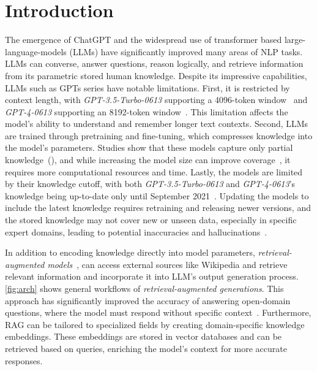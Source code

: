 \section{Introduction}

The emergence of ChatGPT and the widespread use of transformer based large-language-models (LLMs) have significantly improved many areas of NLP tasks. LLMs can converse, answer questions, reason logically, and retrieve information from its parametric stored human knowledge. Despite its impressive capabilities, LLMs such as GPTs series have notable limitations. First, it is restricted by context length, with \emph{GPT-3.5-Turbo-0613} supporting a 4096-token window~\cite{gpt3.5turbo} and \emph{GPT-4-0613} supporting an 8192-token window~\cite{gpt4turbo}. This limitation affects the model's ability to understand and remember longer text contexts. Second, LLMs are trained through pretraining and fine-tuning, which compresses knowledge into the model's parameters. Studies show that these models capture only partial knowledge~(\citet{LAMA}), and while increasing the model size can improve coverage~\citep{T5,DBLP:conf/emnlp/RobertsRS20,GPT3}, it requires more computational resources and time. Lastly, the models are limited by their knowledge cutoff, with both \emph{GPT-3.5-Turbo-0613} and \emph{GPT-4-0613}'s knowledge being up-to-date only until September 2021~\cite{gpt3.5turbo, gpt4turbo}. Updating the models to include the latest knowledge requires retraining and releasing newer versions, and the stored knowledge may not cover new or unseen data, especially in specific expert domains, leading to potential inaccuracies and hallucinations~\cite{maynez-etal-2020-faithfulness}.

In addition to encoding knowledge directly into model parameters, \emph{retrieval-augmented models}~\citep{REALM, RAG, FiD, spanlp-2022-semiparametric}, can access external sources like Wikipedia and retrieve relevant information and incorporate it into LLM’s output generation process. \cref{fig:arch} shows general workflows of \emph{retrieval-augmented generations}. This approach has significantly improved the accuracy of answering open-domain questions, where the model must respond without specific context~\citep{DBLP:conf/acl/ChenFWB17}. Furthermore, RAG can be tailored to specialized fields by creating domain-specific knowledge embeddings. These embeddings are stored in vector databases and can be retrieved based on queries, enriching the model's context for more accurate responses.

